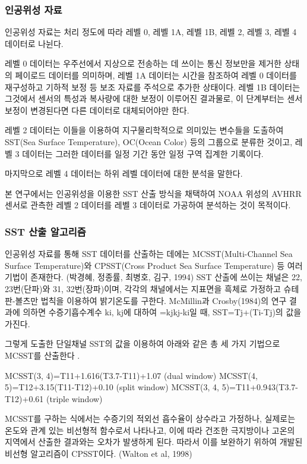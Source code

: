 \subsubsection{인공위성 자료}

인공위성 자료는 처리 정도에 따라 레벨 0, 레벨 1A, 레벨 1B, 레벨 2, 레벨 3, 레벨 4 데이터로 나뉜다\cite{Level}. 

레벨 0 데이터는 우주선에서 지상으로 전송하는 데 쓰이는 통신 정보만을 제거한 상태의 페이로드 데이터를 의미하며, 레벨 1A 데이터는 시간을 참조하여 레벨 0 데이터를 재구성하고 기하적 보정 등 보조 자료를 주석으로 추가한 상태이다. 레벨 1B 데이터는 그것에서 센서의 특성과 복사량에 대한 보정이 이루어진 결과물로, 이 단계부터는 센서 보정이 변경된다면 다른 데이터로 대체되어야만 한다. 

레벨 2 데이터는 이들을 이용하여 지구물리학적으로 의미있는 변수들을 도출하여 SST(Sea Surface Temperature), OC(Ocean Color) 등의 그룹으로 분류한 것이고, 레벨 3 데이터는 그러한 데이터를 일정 기간 동안 일정 구역 집계한 기록이다. 

마지막으로 레벨 4 데이터는 하위 레벨 데이터에 대한 분석을 말한다. 

본 연구에서는 인공위성을 이용한 SST 산출 방식을 채택하여 NOAA 위성의 AVHRR 센서로 관측한 레벨 2 데이터를 레벨 3 데이터로 가공하여 분석하는 것이 목적이다. 

\subsubsection{SST 산출 알고리즘}

인공위성 자료를 통해 SST 데이터를 산출하는 데에는 MCSST(Multi-Channel Sea Surface Temperature)와 CPSST(Cross Product Sea Surface Temperature) 등 여러 기법이 존재한다. (박경혜, 정종률, 최병호, 김구, 1994) SST 산출에 쓰이는 채널은 22, 23번(단파)와 31, 32번(장파)이며, 각각의 채널에서는 지표면을 흑체로 가정하고 슈테판-볼츠만 법칙을 이용하여 밝기온도를 구한다. McMillin과 Crosby(1984)의 연구 결과에 의하면 수증기흡수계수 ki, kj에 대하여 =kjkj-ki일 때, SST=Tj+(Ti-Tj)의 값을 가진다. 

그렇게 도출한 단일채널 SST의 값을 이용하여 아래와 같은 총 세 가지 기법으로 MCSST를 산출한다 \cite{walton1988nonlinear}. 

MCSST(3, 4)=T11+1.616(T3.7-T11)+1.07 (dual window)
MCSST(4, 5)=T12+3.15(T11-T12)+0.10 (split window)
MCSST(3, 4, 5)=T11+0.943(T3.7-T12)+0.61 (triple window)

MCSST를 구하는 식에서는 수증기의 적외선 흡수율이 상수라고 가정하나, 실제로는 온도와 관계 있는 비선형적 함수로서 나타나고, 이에 따라 건조한 극지방이나 고온의 지역에서 산출한 결과와는 오차가 발생하게 된다. 따라서 이를 보완하기 위하여 개발된 비선형 알고리즘이 CPSST이다. (Walton et al, 1998)
